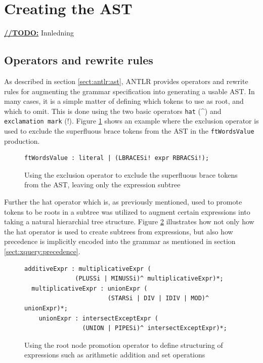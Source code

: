 \section{Creating the AST}

\underline{\textbf{\LARGE //TODO:}} Innledning

\subsection{Operators and rewrite rules}
As described in section \ref{sect:antlr:ast}, ANTLR provides operators and
rewrite rules for augmenting the grammar specification into generating a usable
AST. In many cases, it is a simple matter of defining which tokens to use as
root, and which to omit. This is done using the two basic operators \verb!hat!
(\^{}) and \verb!exclamation mark! (!). Figure \ref{code:ast:exoperator} shows an
example where the exclusion operator is used to exclude the superfluous brace
tokens from the AST in the \verb!ftWordsValue! production.

\begin{figure}[h!]
\begin{verbatim}
ftWordsValue : literal | (LBRACESi! expr RBRACSi!);
\end{verbatim}
\caption[AST exclusion operator example]{Using the exclusion operator to exclude
the superfluous brace tokens from the AST, leaving only the expression subtree}
\label{code:ast:exoperator}
\end{figure}

Further the hat operator which is, as previously mentioned, used to promote
tokens to be roots in a subtree was utilized to augment certain expressions into
taking a natural hierarchial tree structure. Figure \ref{code:ast:hatoperator}
illustrates how not only how the hat operator is used to create subtrees from
expressions, but also how precedence is implicitly encoded into the grammar as
mentioned in section \ref{sect:xquery:precedence}.

\begin{figure}[h!]
\begin{verbatim}
additiveExpr : multiplicativeExpr (
              (PLUSSi | MINUSSi)^ multiplicativeExpr)*;
  multiplicativeExpr : unionExpr (
                       (STARSi | DIV | IDIV | MOD)^ unionExpr)*;
    unionExpr : intersectExceptExpr (
                (UNION | PIPESi)^ intersectExceptExpr)*;
\end{verbatim}
\caption[AST root node promotion operator example]{Using the root node promotion
operator to define structuring of expressions such as arithmetic addition and set
operations}
\label{code:ast:hatoperator}
\end{figure}

